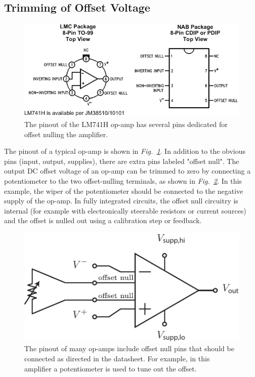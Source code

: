 \subsection{Trimming of Offset Voltage}
\begin{figure}[tb]
\centering
\includegraphics[width=.75\columnwidth]{lm741_pinout}
\caption{The pinout of the LM741H op-amp has several pins dedicated for offset nulling the amplifier.} \label{fig:lm741_pinout}
\end{figure}
The pinout of a typical op-amp is shown in \emph{Fig.~\ref{fig:lm741_pinout}}.  In addition to the obvious pins (input, output, supplies), there are extra pins labeled "offset null".   The output DC offset voltage of an op-amp can be trimmed to zero by connecting a potentiometer to the two offset-nulling terminals, as shown in \emph{Fig.~\ref{fig:opamp_pinout_offset}}. In this example, the wiper of the potentiometer should be connected to the negative supply of the op-amp.  In fully integrated circuits, the offset null circuitry is internal (for example with electronically steerable resistors or current sources) and the offset is nulled out using a calibration step or feedback.  
\begin{figure}[H]
\centering
\includegraphics[scale=1.25]{opamp_pinout_offset}
\caption{The pinout of many op-amps include offset null pins that should be connected as directed in the datasheet.  For example, in this amplifier a potentiometer is used to tune out the offset.} \label{fig:opamp_pinout_offset}
\end{figure}
